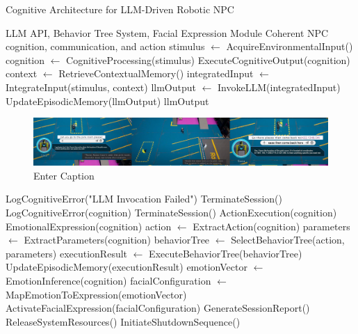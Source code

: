 \begin{algorithm}
    \caption{Cognitive Architecture for LLM-Driven Robotic NPC}\label{algo_cognitive_npc}
    \begin{algorithmic}[1]
    \Require LLM API, Behavior Tree System, Facial Expression Module
    \Ensure Coherent NPC cognition, communication, and action
    \State stimulus $\gets$ AcquireEnvironmentalInput()
    \State cognition $\gets$ CognitiveProcessing(stimulus)
    \State ExecuteCognitiveOutput(cognition)
    \EndWhile
    \EndProcedure
    \State context $\gets$ RetrieveContextualMemory()
    \State integratedInput $\gets$ IntegrateInput(stimulus, context)
    \State llmOutput $\gets$ InvokeLLM(integratedInput)
    \State UpdateEpisodicMemory(llmOutput)
    \State \Return llmOutput
    \Else
\begin{figure}
        \centering
        \includegraphics[width=0.5\linewidth]{Picture1.png}
        \caption{Enter Caption}
        \label{fig:enter-label}
    \end{figure}
        \State LogCognitiveError("LLM Invocation Failed")
    \State TerminateSession()
    \EndIf
    \EndProcedure
    \State LogCognitiveError(cognition)
    \State TerminateSession()
    \Else
    \ParallelProcedureext
    \State ActionExecution(cognition)
    \State EmotionalExpression(cognition)
    \EndParallelProcedure
    \EndIf
    \EndProcedure
    \State action $\gets$ ExtractAction(cognition)
    \State parameters $\gets$ ExtractParameters(cognition)
    \State behaviorTree $\gets$ SelectBehaviorTree(action, parameters)
    \State executionResult $\gets$ ExecuteBehaviorTree(behaviorTree)
    \State UpdateEpisodicMemory(executionResult)
    \EndProcedure
    \State emotionVector $\gets$ EmotionInference(cognition)
    \State facialConfiguration $\gets$ MapEmotionToExpression(emotionVector)
    \State ActivateFacialExpression(facialConfiguration)
    \EndProcedure
    \State GenerateSessionReport()
    \State ReleaseSystemResources()
    \State InitiateShutdownSequence()
    \EndProcedure
    \end{algorithmic}
    \end{algorithm}
